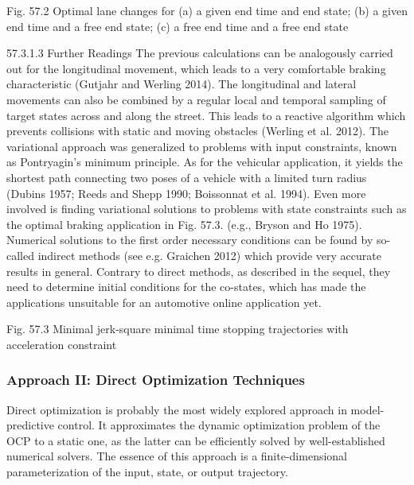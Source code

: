 Fig. 57.2 Optimal lane changes for (a) a given end time and end state; (b) a given end time and a free end state; (c) a free end time and a free end state


57.3.1.3	Further Readings
The previous calculations can be analogously carried out for the longitudinal movement, which leads to a very comfortable braking characteristic (Gutjahr and Werling 2014). The longitudinal and lateral movements can also be combined by a regular local and temporal sampling of target states across and along the street. This leads to a reactive algorithm which prevents collisions with static and moving obstacles (Werling et al. 2012).
The variational approach was generalized to problems with input constraints, known as Pontryagin's minimum principle. As for the vehicular application, it yields the shortest path connecting two poses of 
a vehicle with a limited turn radius (Dubins 1957; Reeds and Shepp 1990; Boissonnat et al. 1994). Even more involved is finding variational solutions to problems with state constraints such as the optimal braking application in Fig. 57.3. (e.g., Bryson and Ho 1975).
Numerical solutions to the first order necessary conditions can be found by so-called indirect methods (see e.g. Graichen 2012) which provide very accurate results in general. Contrary to direct methods, as described in the sequel, they need to determine initial conditions for the co-states, which has made the applications unsuitable for an automotive online application yet.

Fig. 57.3 Minimal jerk-square minimal time stopping trajectories with acceleration constraint 

\subsubsection{Approach II: Direct Optimization Techniques}
Direct optimization is probably the most widely explored approach in model-predictive control. It approximates the dynamic optimization problem of the OCP to a static one, as the latter can be efficiently solved by well-established numerical solvers. The essence of this approach is a finite-dimensional parameterization of the input, state, or output trajectory.






